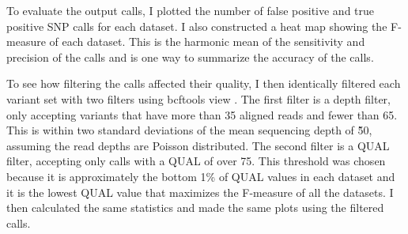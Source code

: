 \documentclass{report}
\begin{document}
\begin{outline}
\item To evaluate the output calls, I plotted the number of false positive and true positive SNP calls for each dataset. I also constructed a heat map showing the F-measure of each dataset. This is the harmonic mean of the sensitivity and precision of the calls and is one way to summarize the accuracy of the calls.

\item To see how filtering the calls affected their quality, I then identically filtered each variant set with two filters using bcftools view \parencite{li_sequence_2009}. The first filter is a depth filter, only accepting variants that have more than 35 aligned reads and fewer than 65. This is within two standard deviations of the mean sequencing depth of \~50, assuming the read depths are Poisson distributed. The second filter is a QUAL filter, accepting only calls with a QUAL of over 75. This threshold was chosen because it is approximately the bottom 1\% of QUAL values in each dataset and it is the lowest QUAL value that maximizes the F-measure of all the datasets. I then calculated the same statistics and made the same plots using the filtered calls.



\end{outline}
\end{document}
